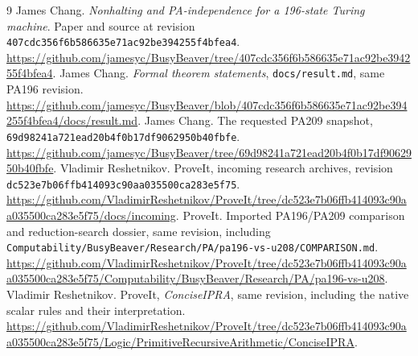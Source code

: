 \documentclass[11pt,letterpaper]{article}
\newcommand{\file}[1]{\texttt{\nolinkurl{#1}}}
\begin{document}
\begin{thebibliography}{9}
 James Chang. \emph{Nonhalting and PA-independence for a
196-state Turing machine}. Paper and source at revision
\file{407cdc356f6b586635e71ac92be394255f4bfea4}.
\url{https://github.com/jamesyc/BusyBeaver/tree/407cdc356f6b586635e71ac92be394255f4bfea4}.
 James Chang. \emph{Formal theorem statements},
\file{docs/result.md}, same PA196 revision.
\url{https://github.com/jamesyc/BusyBeaver/blob/407cdc356f6b586635e71ac92be394255f4bfea4/docs/result.md}.
 James Chang. The requested PA209 snapshot,
\file{69d98241a721ead20b4f0b17df9062950b40fbfe}.
\url{https://github.com/jamesyc/BusyBeaver/tree/69d98241a721ead20b4f0b17df9062950b40fbfe}.
 Vladimir Reshetnikov. ProveIt, incoming research
archives, revision \file{dc523e7b06ffb414093c90aa035500ca283e5f75}.
\url{https://github.com/VladimirReshetnikov/ProveIt/tree/dc523e7b06ffb414093c90aa035500ca283e5f75/docs/incoming}.
 ProveIt. Imported PA196/PA209 comparison and
reduction-search dossier, same revision, including
\file{Computability/BusyBeaver/Research/PA/pa196-vs-u208/COMPARISON.md}.
\url{https://github.com/VladimirReshetnikov/ProveIt/tree/dc523e7b06ffb414093c90aa035500ca283e5f75/Computability/BusyBeaver/Research/PA/pa196-vs-u208}.
 Vladimir Reshetnikov. ProveIt, \emph{ConciseIPRA},
same revision, including the native scalar rules and their interpretation.
\url{https://github.com/VladimirReshetnikov/ProveIt/tree/dc523e7b06ffb414093c90aa035500ca283e5f75/Logic/PrimitiveRecursiveArithmetic/ConciseIPRA}.
\end{thebibliography}
\end{document}
